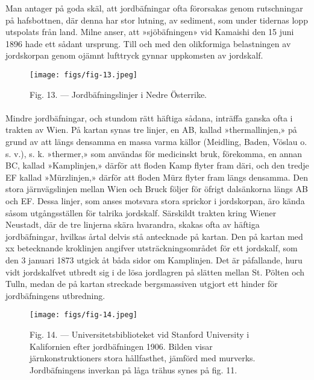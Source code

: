 \documentclass[a4paper, 12pt, oneside, swedish]{article}
\begin{document}
Man antager på goda skäl, att jordbäfningar ofta förorsakas genom rutschningar på hafsbottnen, där denna har stor lutning, av sediment, som under tidernas lopp utspolats från land. Milne anser, att »sjöbäfningen» vid Kamaishi den 15 juni 1896 hade ett sådant ursprung. Till och med den olikformiga belastningen av jordskorpan genom ojämnt lufttryck gynnar uppkomsten av jordskalf.

\begin{figure}[H]
\centering
\texttt{[image: figs/fig-13.jpeg]}
\caption{Fig. 13. --- Jordbäfningslinjer i Nedre Österrike.}
\end{figure}
\paragraph{}
Mindre jordbäfningar, och stundom rätt häftiga sådana, inträffa ganska ofta i trakten av Wien. På kartan synas tre linjer, en AB, kallad »thermallinjen,» på grund av att längs densamma en massa varma källor (Meidling, Baden, Vöslau o. s. v.), s. k. »thermer,» som användas för medicinskt bruk, förekomma, en annan BC, kallad »Kamplinjen,» därför att floden Kamp flyter fram däri, och den tredje EF kallad »Mürzlinjen,» därför att floden Mürz flyter fram längs densamma. Den stora järnvägslinjen mellan Wien och Bruck följer för öfrigt dalsänkorna längs AB och EF. Dessa linjer, som anses motsvara stora sprickor i jordskorpan, äro kända såsom utgångsställen för talrika jordskalf. Särskildt trakten kring Wiener Neustadt, där de tre linjerna skära hvarandra, skakas ofta av häftiga jordbäfningar, hvilkas årtal delvis stå antecknade på kartan. Den på kartan med xx betecknande kroklinjen angifver utsträckningsområdet för ett jordskalf, som den 3 januari 1873 utgick åt båda sidor om Kamplinjen. Det är påfallande, huru vidt jordskalfvet utbredt sig i de lösa jordlagren på slätten mellan St. Pölten och Tulln, medan de på kartan streckade bergsmassiven utgjort ett hinder för jordbäfningens utbredning.

\begin{figure}[H]
\centering
\texttt{[image: figs/fig-14.jpeg]}
\caption{Fig. 14. --- Universitetsbiblioteket vid Stanford University i Kalifornien efter jordbäfningen 1906. Bilden visar järnkonstruktioners stora hållfasthet, jämförd med murverks. Jordbäfningens inverkan på låga trähus synes på fig. 11.}
\end{figure}
\end{document}

